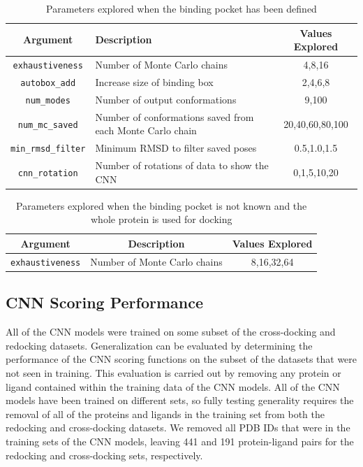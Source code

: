 \documentclass[journal=jcisd8,manuscript=article]{achemso}
\begin{document}
\begin{table}[]
    \centering
    \begin{tabular}{|c|p{}|c|}
        \hline Argument & Description & Values Explored \\ \hline
         \texttt{exhaustiveness} & Number of Monte Carlo chains & 4,8,16 \\ \hline
         \texttt{autobox\_add} & Increase size of binding box & 2,4,6,8 \\ \hline
         \texttt{num\_modes} & Number of output conformations & 9,100 \\ \hline
         \texttt{num\_mc\_saved} & Number of conformations saved from each Monte Carlo chain & 20,40,60,80,100 \\ \hline
         \texttt{min\_rmsd\_filter} & Minimum RMSD to filter saved poses & 0.5,1.0,1.5 \\ \hline
         \texttt{cnn\_rotation} & Number of rotations of data to show the CNN & 0,1,5,10,20 \\ \hline
    \end{tabular}
    \caption{Parameters explored when the binding pocket has been defined}
    \label{tab:SettingsExplPocket}
\end{table}

\begin{table}[]
    \centering
    \begin{tabular}{|c|c|c|}
        \hline Argument & Description & Values Explored \\ \hline
         \texttt{exhaustiveness} & Number of Monte Carlo chains & 8,16,32,64 \\ \hline
    \end{tabular}
    \caption{Parameters explored when the binding pocket is not known and the whole protein is used for docking}
    \label{tab:SettingsExplWP}
\end{table}

\subsection{CNN Scoring Performance}
All of the CNN models were trained on some subset of the cross-docking and redocking datasets. Generalization can be evaluated by determining the performance of the CNN scoring functions on the subset of the datasets that were not seen in training. This evaluation is carried out by removing any protein or ligand contained within the training data of the CNN models. All of the CNN models have been trained on different sets, so fully testing generality requires the removal of all of the proteins and ligands in the training set from both the redocking and cross-docking datasets. We removed all PDB IDs that were in the training sets of the CNN models\cite{liu2017forging,francoeur2020three}, leaving 441 and 191 protein-ligand pairs for the redocking and cross-docking sets, respectively. 
\end{document}

